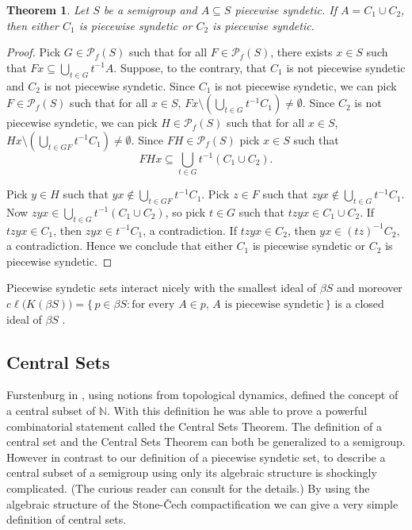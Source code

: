 \documentclass[12pt,showtrims]{memoir}
\theoremstyle{plain}
\newtheorem{thm}{Theorem}[section]
\theoremstyle{definition}
\newcommand{\bbN}{\mathbb{N}}
\newcommand{\Pf}{\mathcal{P}_f}
\begin{document}
\begin{thm}
  \label{prop:psReg}
  Let $S$ be a semigroup and $A \subseteq S$ piecewise syndetic.
  If $A = C_1 \cup C_2$, then either $C_1$ is piecewise syndetic or $C_2$ is piecewise syndetic.
\end{thm}
\begin{proof}
  Pick $G \in \Pf(S)$ such that for all $F \in \Pf(S)$, there exists $x \in S$ such that $Fx \subseteq \bigcup_{t \in G} t^{-1}A$. 
  Suppose, to the contrary, that $C_1$ is not piecewise syndetic and $C_2$ is not piecewise syndetic. 
  Since $C_1$ is not piecewise syndetic, we can pick $F \in \Pf(S)$ such that for all $x \in S$, $Fx \setminus (\bigcup_{t \in G} t^{-1}C_1) \ne \emptyset$. 
  Since $C_2$ is not piecewise syndetic, we can pick $H \in \Pf(S)$ such that for all $x \in S$, $Hx \setminus (\bigcup_{t \in GF} t^{-1}C_1) \ne \emptyset$.
  Since $FH \in \Pf(S)$ pick $x \in S$ such that 
  \[
    FHx \subseteq \bigcup_{t \in G} t^{-1}(C_1 \cup C_2). 
  \]
  
  Pick $y \in H$ such that $yx \not\in \bigcup_{t \in GF} t^{-1}C_1$. 
  Pick $z \in F$ such that $zyx \not\in \bigcup_{t \in G} t^{-1}C_1$. 
  Now $zyx \in \bigcup_{t \in G} t^{-1}(C_1 \cup C_2)$, so pick $t \in G$ such that $tzyx \in C_1 \cup C_2$. 
  If $tzyx \in C_1$, then $zyx \in t^{-1}C_1$, a contradiction.
  If $tzyx \in C_2$, then $yx \in (tz)^{-1}C_2$, a contradiction.
  Hence we conclude that either $C_1$ is piecewise syndetic or $C_2$ is piecewise syndetic.
\end{proof}

  Piecewise syndetic sets interact nicely with the smallest ideal of $\beta S$ \cite[Theorem 4.40]{Hindman:1998fk} and moreover $c\ell\bigl(K(\beta S)\bigr) = \{\, p \in \beta S : \mbox{for every $A \in p$, $A$ is piecewise syndetic} \,\}$ is a closed ideal of $\beta S$ \cite[Corollary 4.41 and Theorem 4.44]{Hindman:1998fk}. 

\subsection{Central Sets}

Furstenburg in \cite[Chapter 8]{Furstenberg:1981fk}, using notions from topological dynamics, defined the concept of a central subset of $\bbN$. 
With this definition he was able to prove a powerful combinatorial statement called the Central Sets Theorem. 
The definition of a central set and the Central Sets Theorem can both be generalized to a semigroup.
However in contrast to our definition of a piecewise syndetic set, to describe a central subset of a semigroup using only its algebraic structure is shockingly complicated.
(The curious reader can consult \cite[Section 14.5]{Hindman:1998fk} for the details.)
By using the algebraic structure of the Stone-\v{C}ech compactification we can give a very simple definition of central sets.
\end{document}
